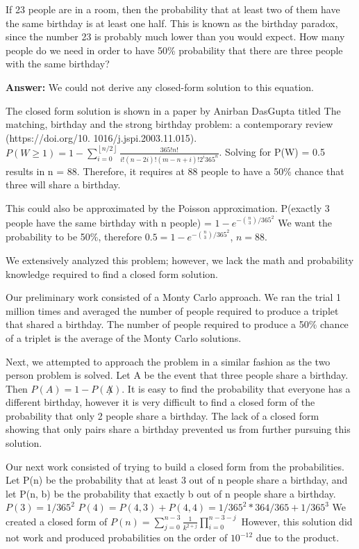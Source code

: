 \documentclass{article}
\author{Group 13: Elliott Pryor, Ben Bushnell, Shengnan Zhou}
\date{due: 18 October 2019}
\begin{document}
\nextprob
If 23 people are in a room, then the probability that at least two of them have
the same birthday is at least one half.  This is known as the birthday paradox,
since the number 23 is probably much lower than you would expect.  How many
people do we need in order to have 50\% probability that there are three people
with the same birthday?


\textbf{Answer: } We could not derive any closed-form solution to this equation.

The closed form solution is shown in a paper by Anirban DasGupta titled The matching,
birthday and the strong birthday problem: a contemporary review (https://doi.org/10.
1016/j.jspi.2003.11.015). $P(W \geq 1) = 1 - \sum_{i=0}^{\left \lfloor{n/2}\right \rfloor } \frac{365!n!}{i!(n-2i)!(m-n+i)!2^i365^n}$.
Solving for P(W) = 0.5 results in n = 88. Therefore, it requires at 88 people to have a 50\% chance that three will share a birthday.

This could also be approximated by the Poisson approximation.
P(exactly 3 people have the same birthday with n people) = $1 - e^{-{n\choose 3}/365^2}$
We want the probability to be 50\%, therefore $0.5 = 1 - e^{-{n\choose 3}/365^2}$,
$n = 88$.

We extensively analyzed this problem; however, we lack the math and probability knowledge required to find a closed form solution.

Our preliminary work consisted of a Monty Carlo approach. We ran the trial 1 million times and averaged the number of people required to produce a triplet that shared a birthday.
The number of people required to produce a 50\% chance of a triplet is the average of the Monty Carlo solutions.

Next, we attempted to approach the problem in a similar fashion as the two person problem is solved.
Let A be the event that three people share a birthday. Then $P(A) = 1 - P(\not A)$.
It is easy to find the probability that everyone has a different birthday, however it is very difficult to find a closed form of the probability that only 2 people share a birthday.
The lack of a closed form showing that only pairs share a birthday prevented us from further pursuing this solution.

Our next work consisted of trying to build a closed form from the probabilities. Let P(n) be the probability that at least 3 out of n people share a birthday,
and let P(n, b) be the probability that exactly b out of n people share a birthday.
$P(3) = 1/365^2$
$P(4) = P(4,3) + P(4,4) = 1/365^2 * 364/365 + 1/365^3$
We created a closed form of $P(n) = \sum_{j=0}^{n-3} \frac{1}{k^{2+j}} \prod_{i=0}^{n-3-j}$ However,
this solution did not work and produced probabilities on the order of $10^{-12}$ due to the product.
\end{document}
